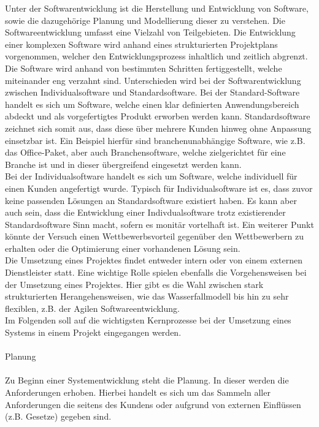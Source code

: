 Unter der Softwarentwicklung ist die Herstellung und Entwicklung von Software, sowie die dazugehörige Planung und Modellierung dieser zu verstehen. Die Softwareentwicklung umfasst eine Vielzahl von Teilgebieten. Die Entwicklung einer komplexen Software wird anhand eines strukturierten Projektplans vorgenommen, welcher den Entwicklungsprozess inhaltlich und zeitlich abgrenzt. Die Software wird anhand von bestimmten Schritten fertiggestellt, welche miteinander eng verzahnt sind. Unterschieden wird bei der Softwarentwicklung zwischen Individualsoftware und Standardsoftware. Bei der Standard-Software handelt es sich um Software, welche einen klar definierten Anwendungsbereich abdeckt und als vorgefertigtes Produkt erworben werden kann. Standardsoftware zeichnet sich somit aus, dass diese über mehrere Kunden hinweg ohne Anpassung einsetzbar ist. Ein Beispiel hierfür sind branchenunabhängige Software, wie z.B. das Office-Paket, aber auch Branchensoftware, welche zielgerichtet für eine Branche ist und in dieser übergreifend eingesetzt werden kann.\\
Bei der Individualsoftware handelt es sich um Software, welche individuell für einen Kunden angefertigt wurde. Typisch für Individualsoftware ist es, dass zuvor keine passenden Lösungen an Standardsoftware existiert haben.  Es kann aber auch sein, dass die Entwicklung einer Indivdualsoftware trotz existierender Standardsoftware Sinn macht, sofern es monitär vortelhaft ist.
Ein weiterer Punkt  könnte der Versuch einen Wettbewerbsvorteil gegenüber den Wettbewerbern zu erhalten oder die Optimierung einer vorhandenen Lösung sein.\\
Die Umsetzung eines Projektes findet entweder intern oder von einem externen Dienstleister statt. Eine wichtige Rolle spielen ebenfalls die Vorgehensweisen bei der Umsetzung eines Projektes. Hier gibt es die Wahl zwischen stark strukturierten Herangehensweisen, wie das Wasserfallmodell bis hin zu sehr flexiblen, z.B. der Agilen Softwareentwicklung.\\
Im Folgenden soll auf die wichtigsten Kernprozesse bei der Umsetzung eines Systems in einem Projekt eingegangen werden.\\
\\
Planung\\
\\
Zu Beginn einer Systementwicklung steht die Planung. In dieser werden die Anforderungen erhoben.
Hierbei handelt es sich um das Sammeln aller Anforderungen die seitens des Kundens oder aufgrund von externen Einflüssen (z.B. Gesetze) gegeben sind.
